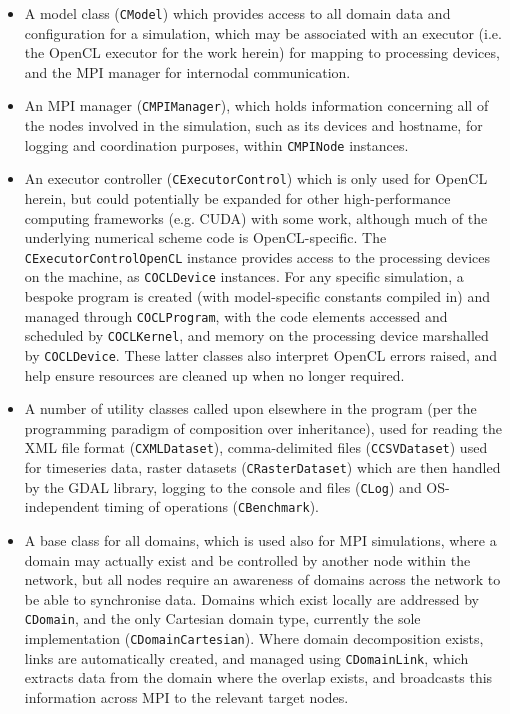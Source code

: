 \begin{itemize}
	\item A model class (\texttt{CModel}) which provides access to all domain data and configuration for a simulation, which may be associated with an executor (i.e. the OpenCL executor for the work herein) for mapping to processing devices, and the MPI manager for internodal communication.
	\item An MPI manager (\texttt{CMPIManager}), which holds information concerning all of the nodes involved in the simulation, such as its devices and hostname, for logging and coordination purposes, within \texttt{CMPINode} instances.
	\item An executor controller (\texttt{CExecutorControl}) which is only used for OpenCL herein, but could potentially be expanded for other high-performance computing frameworks (e.g. CUDA) with some work, although much of the underlying numerical scheme code is OpenCL-specific. The \texttt{CExecutorControlOpenCL} instance provides access to the processing devices on the machine, as \texttt{COCLDevice} instances. For any specific simulation, a bespoke program is created (with model-specific constants compiled in) and managed through \texttt{COCLProgram}, with the code elements accessed and scheduled by \texttt{COCLKernel}, and memory on the processing device marshalled by \texttt{COCLDevice}. These latter classes also interpret OpenCL errors raised, and help ensure resources are cleaned up when no longer required.
	\item A number of utility classes called upon elsewhere in the program (per the programming paradigm of composition over inheritance), used for reading the XML file format (\texttt{CXMLDataset}), comma-delimited files (\texttt{CCSVDataset}) used for timeseries data, raster datasets (\texttt{CRasterDataset}) which are then handled by the GDAL library, logging to the console and files (\texttt{CLog}) and OS-independent timing of operations (\texttt{CBenchmark}).
	\item A base class for all domains, which is used also for MPI simulations, where a domain may actually exist and be controlled by another node within the network, but all nodes require an awareness of domains across the network to be able to synchronise data. Domains which exist locally are addressed by \texttt{CDomain}, and the only Cartesian domain type, currently the sole implementation (\texttt{CDomainCartesian}). Where domain decomposition exists, links are automatically created, and managed using \texttt{CDomainLink}, which extracts data from the domain where the overlap exists, and broadcasts this information across MPI to the relevant target nodes.

\end{itemize}
